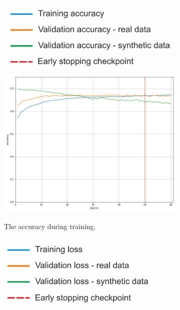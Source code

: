 \begin{figure}[!h]
\centering
    \begin{subfigure}[t]{.45\textwidth}
        \centering
        \includegraphics[width=.7\textwidth]{images/popisAc.png}
        \includegraphics[width=\textwidth]{images/accuracy14fe_0.png}
        \caption{The accuracy during training.}
        \label{fig:accm33}
    \end{subfigure}
    \begin{subfigure}[t]{.45\textwidth}
        \centering
        \includegraphics[width=.7\textwidth]{images/popisLoss.png}

\end{subfigure}
\end{figure}
